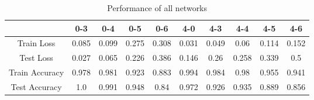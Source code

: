 \begin{table}
	\centering
	\caption{Performance of all networks}
	\label{tab:network-performances}
	\begin{tabular}{c|c|c|c|c|c|c|c|c|c}
		& 0-3 & 0-4 & 0-5 & 0-6 & 4-0 & 4-3 & 4-4 & 4-5 & 4-6 \\ \hline
		Train Loss & 0.085 & 0.099 & 0.275 & 0.308 & 0.031 & 0.049 & 0.06 & 0.114 & 0.152 \\
		Test Loss & 0.027 & 0.065 & 0.226 & 0.386 & 0.146 & 0.26 & 0.258 & 0.339 & 0.5 \\ \hline
		Train Accuracy & 0.978 & 0.981 & 0.923 & 0.883 & 0.994 & 0.984 & 0.98 & 0.955 & 0.941 \\
		Test Accuracy & 1.0 & 0.991 & 0.948 & 0.84 & 0.972 & 0.926 & 0.935 & 0.889 & 0.856 \\
	\end{tabular}
\end{table}
